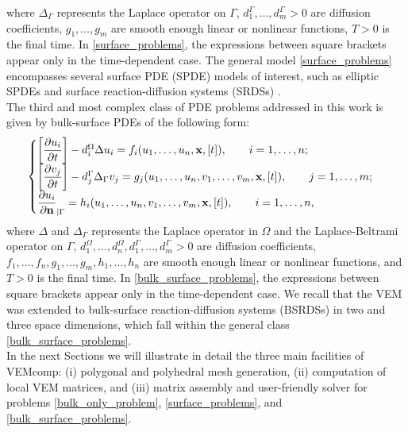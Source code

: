 \documentclass[a4paper]{article}
\begin{document}
{where $\Delta_\Gamma$ represents the Laplace operator on $\Gamma$, $d_1^\Gamma,\dots, d_m^\Gamma > 0$ are diffusion coefficients,  $g_1, \dots, g_m$ are smooth enough linear or nonlinear functions, $T>0$ is the final time. In \eqref{surface_problems}, the expressions between square brackets appear only in the time-dependent case. The general model \eqref{surface_problems} encompasses several surface PDE (SPDE) models of interest, such as elliptic SPDEs \cite{bachini2021arbitrary, frittelli2018virtual} and surface reaction-diffusion systems (SRDSs) \cite{lacitignola2017turing, lacitignola2022pattern}.\\
The third and most complex class of PDE problems addressed in this work is given by bulk-surface PDEs of the following form:
\begin{equation}
\label{bulk_surface_problems}
\begin{cases}
\left[\dfrac{\partial u_i}{\partial t}\right] - d_i^\Omega \Delta u_i = f_i(u_1,\dots,u_n, \bold x, [t]), \qquad i=1,\dots, n;\\
\left[\dfrac{\partial v_j}{\partial t}\right] - d_j^\Gamma \Delta_\Gamma v_j = g_j(u_1,\dots,u_n, v_1,\dots, v_m,\bold x, [t]), \qquad j=1,\dots,m;\\
\dfrac{\partial u_i}{\partial \bold n}_{|\Gamma} = h_i(u_1,\dots,u_n,v_1,\dots,v_m,\bold x, [t]), \qquad i=1,\dots,n,
\end{cases}
\end{equation}
where $\Delta$ and $\Delta_\Gamma$ represents the Laplace operator in $\Omega$ and the Laplace-Beltrami operator on $\Gamma$, $d_1^\Omega,\dots, d_n^\Omega,  d_1^\Gamma,\dots, d_m^\Gamma > 0$ are diffusion coefficients,  $f_1, \dots, f_n, g_1,\dots,g_m,h_1,\dots,h_n$ are smooth enough linear or nonlinear functions, and $T>0$ is the final time.  In \eqref{bulk_surface_problems}, the expressions between square brackets appear only in the time-dependent case.  We recall that the VEM was extended to bulk-surface reaction-diffusion systems (BSRDSs) in two \cite{frittelli2021bulk} and three \cite{frittelli2023bsrds} space dimensions, which fall within the general class \eqref{bulk_surface_problems}. \\
In the next Sections we will illustrate in detail the three main facilities of VEMcomp: (i) polygonal and polyhedral mesh generation, (ii) computation of local VEM matrices, and (iii)  matrix assembly and user-friendly solver for problems \eqref{bulk_only_problem}, \eqref{surface_problems}, and \eqref{bulk_surface_problems}.}
\end{document}
